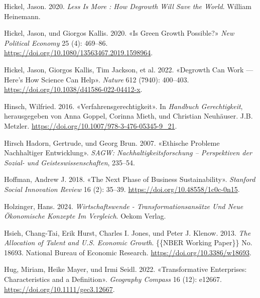 \documentclass[
  nswissgerman,
  a4paper,
  DIV=11,
  numbers=noendperiod,
  oneside,
  openany]{scrreprt}
\newlength{\cslhangindent}
\newenvironment{CSLReferences}[2] %
 {\begin{list}{}{%
  \setlength{\itemindent}{0pt}
  \setlength{\leftmargin}{0pt}
  \setlength{\parsep}{0pt}
  \ifodd #1
   \setlength{\leftmargin}{\cslhangindent}
   \setlength{\itemindent}{-1\cslhangindent}
  \fi
  \setlength{\itemsep}{#2\baselineskip}}}
 {\end{list}}
\begin{document}
\begin{CSLReferences}{1}{1}
Hickel, Jason. 2020. \emph{Less Is More : How Degrowth Will Save the
World}. William Heinemann.

Hickel, Jason, und Giorgos Kallis. 2020. {«Is {Green Growth Possible}?»}
\emph{New Political Economy} 25 (4): 469--86.
\url{https://doi.org/10.1080/13563467.2019.1598964}.

Hickel, Jason, Giorgos Kallis, Tim Jackson, et al. 2022. {«Degrowth Can
Work --- Here's How Science Can Help»}. \emph{Nature} 612 (7940):
400--403. \url{https://doi.org/10.1038/d41586-022-04412-x}.

Hinsch, Wilfried. 2016. {«{Verfahrensgerechtigkeit}»}. In
\emph{{Handbuch Gerechtigkeit}}, herausgegeben von Anna Goppel, Corinna
Mieth, und Christian Neuhäuser. J.B. Metzler.
\url{https://doi.org/10.1007/978-3-476-05345-9_21}.

Hirsch Hadorn, Gertrude, und Georg Brun. 2007. {«Ethische {Probleme}
Nachhaltiger {Entwicklung}»}. \emph{SAGW: Nachhaltigkeitsforschung --
Perspektiven der Sozial- und Geisteswissenschaften}, 235--54.

Hoffman, Andrew J. 2018. {«The {Next Phase} of {Business
Sustainability}»}. \emph{Stanford Social Innovation Review} 16 (2):
35--39. \url{https://doi.org/10.48558/1c0c-0n15}.

Holzinger, Hans. 2024. \emph{Wirtschaftswende -
{Transformationsans{ä}tze} Und Neue {Ö}konomische {Konzepte} Im
{Vergleich}}. Oekom Verlag.

Hsieh, Chang-Tai, Erik Hurst, Charles I. Jones, und Peter J. Klenow.
2013. \emph{The {Allocation} of {Talent} and {U}.{S}. {Economic
Growth}}. \{\{NBER Working Paper\}\} No. 18693. National Bureau of
Economic Research. \url{https://doi.org/10.3386/w18693}.

Hug, Miriam, Heike Mayer, und Irmi Seidl. 2022. {«Transformative
Enterprises: {Characteristics} and a Definition»}. \emph{Geography
Compass} 16 (12): e12667. \url{https://doi.org/10.1111/gec3.12667}.


\end{CSLReferences}
\end{document}
